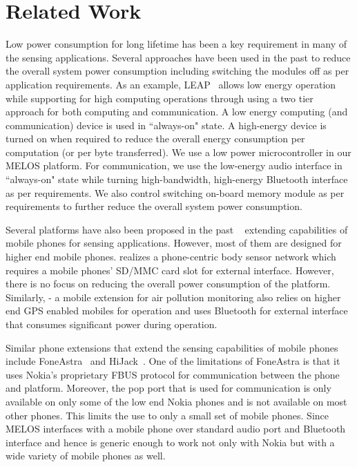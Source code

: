 \documentclass[10pt]{sigplan-proc-varsize}
\newcommand{\melos}{MELOS }
\begin{document}
\section{Related Work}
\label{sec:rw}
Low power consumption for long lifetime has been a key requirement in many of the sensing applications. Several approaches have been used in the past to reduce the overall system power consumption including switching the modules off as per application requirements. As an example, LEAP~\cite{LEAP} allows low energy operation while supporting for high computing operations through using a two tier approach for both computing and communication. A low energy computing (and communication) device is used in ``always-on" state. A high-energy device is turned on when required to reduce the overall energy consumption per computation (or per byte transferred). We use a low power microcontroller in our \melos platform. For communication, we use the low-energy audio interface in ``always-on" state while turning high-bandwidth, high-energy Bluetooth interface as per requirements. We also control switching on-board memory module as per requirements to further reduce the overall system power consumption. 

Several platforms have also been proposed in the past ~\cite{psi,nsmarts,smartconnect,foneastra,hijack} extending capabilities of mobile phones for sensing applications. However, most of them are designed for higher end mobile phones. \cite{psi} realizes a phone-centric body sensor network which requires a mobile phones'  SD/MMC card slot for external interface. However, there is no focus on reducing the overall power consumption of the platform. Similarly, \cite{nsmarts} - a mobile extension for air pollution monitoring also relies on higher end GPS enabled mobiles for operation and uses Bluetooth for external interface that consumes significant power during operation. 

Similar phone extensions that extend the sensing capabilities of mobile phones include FoneAstra~\cite{foneastra} and HiJack~\cite{hijack}. One of the limitations of FoneAstra is that it uses Nokia's proprietary FBUS protocol for communication between the phone and platform. Moreover, the pop port that is used for communication is only available on only some of the low end Nokia phones and is not available on most other phones. This limits the use to only a small set of mobile phones. Since \melos interfaces with a mobile phone over standard audio port and Bluetooth interface and hence is generic enough to work not only with Nokia but with a wide variety of mobile phones as well. 
\end{document}
